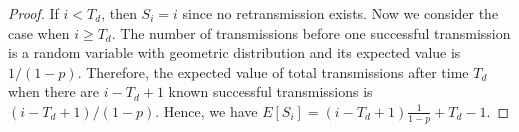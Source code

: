 \begin{proof}
    If $i<T_d$, then $S_i = i$ since no retransmission exists.
    Now we consider the case when $i \geq T_d$.
    The number of transmissions before one successful transmission
    is a random variable with geometric distribution and its
    expected value is $1/(1-p)$.  Therefore, the expected value of
    total transmissions after time $T_d$ when there are
    $i - T_d + 1$ known successful transmissions is $(i - T_d +1)/(1-p)$.
    Hence, we have 
        $E[S_i]          = (i - T_d + 1)\frac{1}{1-p} + T_d - 1$.

\end{proof}
